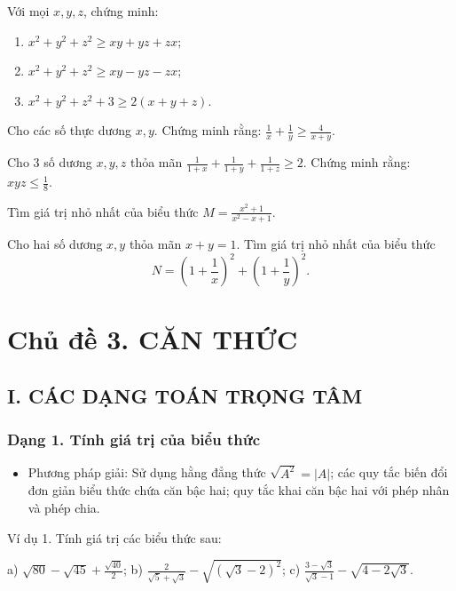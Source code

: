 \documentclass[%
    fontsize=12pt,%
    chapterprefix=false,%
    open=right,%
    twoside=false,%
    numbers=noenddot,%
    headings=optiontohead,%
    final,%
    DIV=15,%
    parskip=half %
]{scrbook}
\begin{document}
\begin{tuluan}
\item Với mọi $ x, y, z $, chứng minh:
\begin{enumerate}[label=\alph*)]
  \item[a)] $ x^2 + y^2 + z^2 \geq xy + yz + zx $;
  \item[b)] $ x^2 + y^2 + z^2 \geq xy - yz - zx $;
  \item[c)] $ x^2 + y^2 + z^2 + 3 \geq 2(x + y + z) $.
\end{enumerate}

\item Cho các số thực dương $ x, y $. Chứng minh rằng: $ \frac{1}{x} + \frac{1}{y} \geq \frac{4}{x + y} $.

\item Cho 3 số dương $ x, y, z $ thỏa mãn $ \frac{1}{1 + x} + \frac{1}{1 + y} + \frac{1}{1 + z} \geq 2 $. Chứng minh rằng: $ xyz \leq \frac{1}{8} $.

\item Tìm giá trị nhỏ nhất của biểu thức $ M = \frac{x^2 + 1}{x^2 - x + 1} $.

\item Cho hai số dương $ x, y $ thỏa mãn $ x + y = 1 $. Tìm giá trị nhỏ nhất của biểu thức \[ N = \left(1 + \frac{1}{x}\right)^2 + \left(1 + \frac{1}{y}\right)^2. \]

\end{tuluan}

\section{Chủ đề 3. CĂN THỨC}
\subsection{I. CÁC DẠNG TOÁN TRỌNG TÂM}
\subsubsection{Dạng 1. Tính giá trị của biểu thức}

\begin{itemize}
  \item Phương pháp giải: Sử dụng hằng đẳng thức $ \sqrt{A^2} = |A| $; các quy tắc biến đổi đơn giản biểu thức chứa căn bậc hai; quy tắc khai căn bậc hai với phép nhân và phép chia.
\end{itemize}

Ví dụ 1. Tính giá trị các biểu thức sau:

a) $ \sqrt{80} - \sqrt{45} + \frac{\sqrt{40}}{2} $; b) $ \frac{2}{\sqrt{5} + \sqrt{3}} - \sqrt{(\sqrt{3} - 2)^2} $; c) $ \frac{3 - \sqrt{3}}{\sqrt{3} - 1} - \sqrt{4 - 2\sqrt{3}} $.
\end{document}
